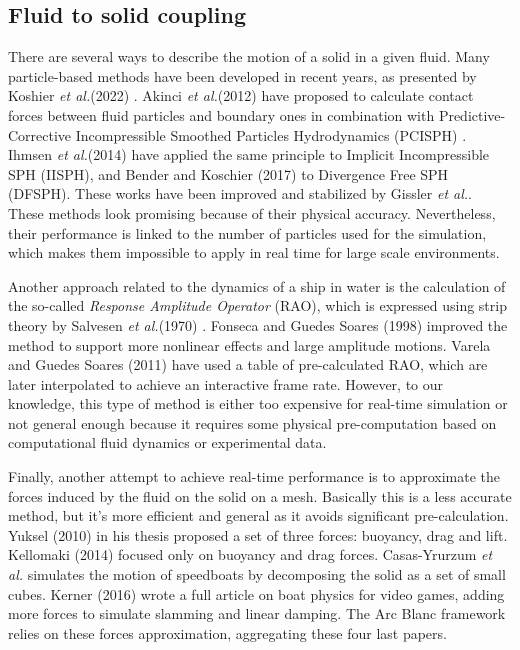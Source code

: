 \documentclass[final]{jcgt}
\def\Framework{The Arc Blanc framework\xspace}
\def\etal{\emph{et al.}\xspace}
\begin{document}
\subsection{Fluid to solid coupling}
\label{subsubsec:fluidToSolidCoupling}
There are several ways to describe the motion of a solid in a given fluid.
Many particle-based methods have been developed in recent years, as presented by Koshier \etal (2022) \cite{koschierSurveySPHMethods2022}.
Akinci \etal (2012) \cite{akinciVersatileRigidfluidCoupling2012} have proposed to calculate contact forces between fluid particles and boundary ones in combination with Predictive-Corrective Incompressible Smoothed Particles Hydrodynamics (PCISPH) \cite{solenthalerPredictivecorrectiveIncompressibleSPH2009}.
Ihmsen \etal (2014) \cite{ihmsenImplicitIncompressibleSPH2014} have applied the same principle to Implicit Incompressible SPH (IISPH), and Bender and Koschier (2017)  \cite{benderDivergenceFreeSPHIncompressible2017} to Divergence Free SPH (DFSPH).
These works have been improved and stabilized by Gissler  \etal \cite{gisslerInterlinkedSPHPressure2019}.
These methods look promising because of their physical accuracy.
Nevertheless, their performance is linked to the number of particles used for the simulation, which makes them impossible to apply in real time for large scale environments.

Another approach related to the dynamics of a ship in water is the calculation of the so-called \emph{Response Amplitude Operator} (RAO), which is expressed using strip theory by Salvesen  \etal (1970) \cite{salvesenShipMotionsSea1970}. Fonseca and Guedes Soares (1998) \cite{fonsecaTimeDomainAnalysisLargeAmplitude1998} improved the method to support more nonlinear effects and large amplitude motions. Varela and Guedes Soares (2011) \cite{varelaInteractiveSimulationShip2011} have used a table of pre-calculated RAO, which are later interpolated to achieve an interactive frame rate.
However, to our knowledge, this type of method is either too expensive for real-time simulation or not general enough because it requires some physical pre-computation based on computational fluid dynamics or experimental data.

Finally, another attempt to achieve real-time performance is to approximate the forces induced by the fluid on the solid on a mesh.
Basically this is a less accurate method, but it's more efficient and general as it avoids significant pre-calculation.
Yuksel (2010) \cite{yukselRealtimeWaterWaves2010} in his thesis proposed a set of three forces: buoyancy, drag and lift.
Kellomaki (2014) \cite{kellomakiRigidBodyInteraction2014} focused only on buoyancy and drag forces.
Casas-Yrurzum  \etal \cite{casas-yrurzumRealtimePhysicsSimulation2012a} simulates the motion of speedboats by decomposing the solid as a set of small cubes.
Kerner (2016) \cite{kernerWaterInteractionModel2016} wrote a full article on boat physics for video games, adding more forces to simulate slamming and linear damping.
\Framework relies on these forces approximation, aggregating these four last papers.
\end{document}
